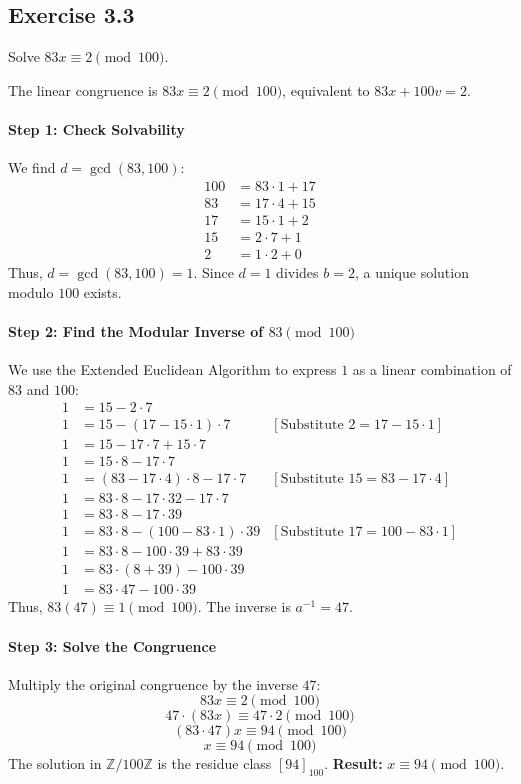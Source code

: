 \subsection*{Exercise 3.3}
Solve $83x \equiv 2 \pmod{100}$.

\begin{solution}
The linear congruence is $83x \equiv 2 \pmod{100}$, equivalent to $83x + 100v = 2$.

\paragraph{Step 1: Check Solvability}
We find $d = \gcd(83, 100)$:
\begin{align*}
    100 &= 83 \cdot 1 + 17 \\
    83 &= 17 \cdot 4 + 15 \\
    17 &= 15 \cdot 1 + 2 \\
    15 &= 2 \cdot 7 + 1 \\
    2 &= 1 \cdot 2 + 0
\end{align*}
Thus, $d = \gcd(83, 100) = 1$. Since $d=1$ divides $b=2$, a unique solution modulo $100$ exists.

\paragraph{Step 2: Find the Modular Inverse of $83 \pmod{100}$}
We use the Extended Euclidean Algorithm to express $1$ as a linear combination of $83$ and $100$:
\begin{align*}
    1 &= 15 - 2 \cdot 7 \\
    1 &= 15 - (17 - 15 \cdot 1) \cdot 7 & [\text{Substitute } 2 = 17 - 15 \cdot 1] \\
    1 &= 15 - 17 \cdot 7 + 15 \cdot 7 \\
    1 &= 15 \cdot 8 - 17 \cdot 7 \\
    1 &= (83 - 17 \cdot 4) \cdot 8 - 17 \cdot 7 & [\text{Substitute } 15 = 83 - 17 \cdot 4] \\
    1 &= 83 \cdot 8 - 17 \cdot 32 - 17 \cdot 7 \\
    1 &= 83 \cdot 8 - 17 \cdot 39 \\
    1 &= 83 \cdot 8 - (100 - 83 \cdot 1) \cdot 39 & [\text{Substitute } 17 = 100 - 83 \cdot 1] \\
    1 &= 83 \cdot 8 - 100 \cdot 39 + 83 \cdot 39 \\
    1 &= 83 \cdot (8 + 39) - 100 \cdot 39 \\
    1 &= 83 \cdot 47 - 100 \cdot 39
\end{align*}
Thus, $83(47) \equiv 1 \pmod{100}$. The inverse is $a^{-1} = 47$.

\paragraph{Step 3: Solve the Congruence}
Multiply the original congruence by the inverse $47$:
$$ 83x \equiv 2 \pmod{100} $$
$$ 47 \cdot (83x) \equiv 47 \cdot 2 \pmod{100} $$
$$ (83 \cdot 47) x \equiv 94 \pmod{100} $$
$$ x \equiv 94 \pmod{100} $$
The solution in $\mathbb{Z}/100\mathbb{Z}$ is the residue class $[94]_{100}$.
\textbf{Result:} $x \equiv 94 \pmod{100}$.
\end{solution}
\newpage
